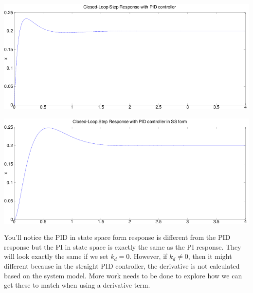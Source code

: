 \documentclass[10pt,letterpaper]{article}
\begin{document}
\begin{center}
\includegraphics[scale=0.6]{image-pid}
\end{center}

\begin{center}
\includegraphics[scale=0.6]{image-pid-ss}
\end{center}

You'll notice the PID in state space form response is different from the PID response but the PI in state space is exactly the same as the PI response. They will look exactly the same if we set $k_d = 0$. However, if $k_d \neq 0$, then it might different because in the straight PID controller, the derivative is not calculated based on the system model. More work needs to be done to explore how we can get these to match when using a derivative term.
\end{document}
